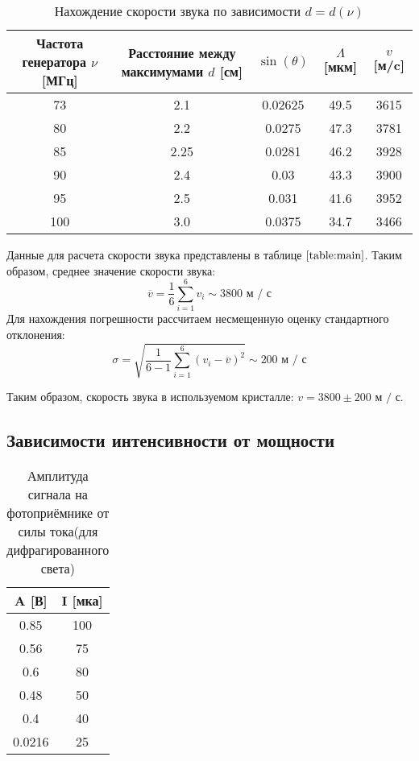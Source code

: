 \documentclass[a4paper, 12pt]{extarticle}
\begin{document}
\begin{table}[hbtp]
    \centering
\begin{tabular}{|c|c|c|c|c|}
    \hline
Частота генератора $\nu$ [МГц]& Расстояние между максимумами $d$ [см]&$\sin(\theta)$&$\Lambda$ [мкм]&$v$ [м/c]\\
\hline
73&2.1&0.02625&49.5&3615\\
80&2.2&0.0275&47.3&3781\\
85&2.25&0.0281&46.2&3928\\
90&2.4&0.03&43.3&3900\\
95&2.5&0.031&41.6&3952\\
100&3.0&0.0375&34.7&3466\\
\hline
\end{tabular}
\label{table:main}
\caption{Нахождение скорости звука по зависимости $d = d(\nu)$}
\end{table}

Данные для расчета скорости звука представлены в таблице $\ref{table:main}$. Таким образом, среднее значение скорости звука:
$$
\overline{v} = \frac{1}{6} \sum_{i = 1}^{6} v_{i} \sim 3800 \text{ м / с}
$$
Для нахождения погрешности рассчитаем несмещенную оценку стандартного отклонения:
$$
\sigma = \sqrt{\frac{1}{6 - 1} \sum_{i = 1}^{6} (v_{i} - \overline{v})^{2}} \sim 200 \text{ м / с} 
$$

Таким образом, скорость звука в используемом кристалле: \underline{$v = 3800 \pm 200 \text{ м / с}$}.


\subsection*{\textcolor{sub_header}{Зависимости интенсивности от мощности}}


\begin{table}[hbtp]
    \centering
\begin{tabular}{|c|c|}
    \hline
A [В]&I [мка]\\
\hline
0.85&100\\
0.56&75\\
0.6&80\\
0.48&50\\
0.4&40\\
0.0216&25\\
\hline
\end{tabular}
\label{table:diff}
\caption{Амплитуда сигнала на фотоприёмнике от силы тока(для дифрагированного света)}
\end{table}
\end{document}
